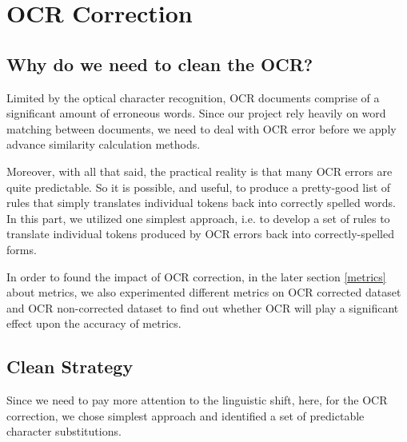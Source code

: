 \section{OCR Correction}
\subsection{Why do we need to clean the OCR?}

Limited by the optical character recognition, OCR documents comprise of a significant amount of erroneous words. Since our project rely heavily on word matching between documents, we need to deal with OCR error before we apply advance similarity calculation methods. 

Moreover, with all that said, the practical reality is that many OCR errors are quite predictable. So it is possible, and useful, to produce a pretty-good list of rules that simply translates individual tokens back into correctly spelled words. In this part, we utilized one simplest approach, i.e. to develop a set of rules to translate individual tokens produced by OCR errors back into correctly-spelled forms.

In order to found the impact of OCR correction, in the later section \ref{metrics} about metrics, we also experimented different metrics on OCR corrected dataset and OCR non-corrected dataset to find out whether OCR will play a significant effect upon the accuracy of metrics.

\subsection{Clean Strategy}
Since we need to pay more attention to the linguistic shift, here, for the OCR correction, we chose simplest approach and identified a set of predictable character substitutions. 

